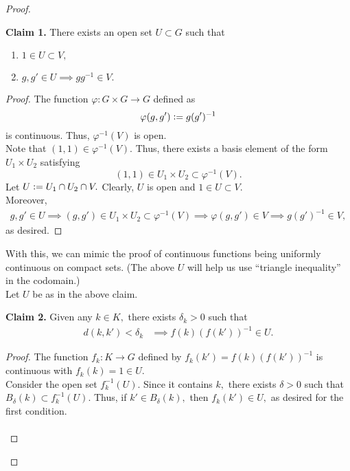 \documentclass[12pt]{article}
\theoremstyle{definition}
\numberwithin{thm}{section}
\newenvironment{blockquote}
{\begin{mdframed}[skipabove=0pt, skipbelow=0pt, innertopmargin=4pt, innerbottommargin=4pt, bottomline=false,topline=false,rightline=false, linewidth=2pt]}
{\end{mdframed}}
\begin{document}
\begin{proof} \phantom{hi}

	\begin{blockquote}
		\textbf{Claim 1.} There exists an open set $U \subset G$ such that
		\begin{enumerate}
			\item $1 \in U \subset V,$
			\item $g, g' \in U \implies gg^{-1} \in V.$
		\end{enumerate}
		\begin{proof} 
			The function $\varphi:G \times G \to G$ defined as
			\begin{equation*} 
				\varphi(g, g') \vcentcolon= g(g')^{-1}
			\end{equation*}
			is continuous. Thus, $\varphi^{-1}(V)$ is open.\\
			Note that $(1, 1) \in \varphi^{-1}(V).$ Thus, there exists a basis element of the form $U_1 \times U_2$ satisfying
			\begin{equation*} 
				(1, 1) \in U_1 \times U_2 \subset \varphi^{-1}(V).
			\end{equation*}
			Let $U\vcentcolon= U_1 \cap U_2 \cap V.$ Clearly, $U$ is open and $1 \in U \subset V.$ \\
			Moreover,
			\begin{align*} 
				g, g' \in U \implies (g, g') \in U_1 \times U_2 \subset \varphi^{-1}(V) \implies \varphi(g, g') \in V \implies g(g')^{-1} \in V,
			\end{align*}
			as desired.
		\end{proof}
	\end{blockquote}
		With this, we can mimic the proof of continuous functions being uniformly continuous on compact sets. (The above $U$ will help us use ``triangle inequality'' in the codomain.)\\
		Let $U$ be as in the above claim.\\
	\begin{blockquote}
		\textbf{Claim 2.} Given any $k \in K,$ there exists $\delta_k > 0$ such that
		\begin{align*} 
			d(k, k') < \delta_k &\implies f(k)(f(k'))^{-1} \in U.	
		\end{align*}
		\begin{proof} 
			The function $f_k : K \to G$ defined by $f_k(k') = f(k)(f(k'))^{-1}$ is continuous with $f_k(k) = 1 \in U.$\\
			Consider the open set $f_k^{-1}(U).$ Since it contains $k,$ there exists $\delta > 0$ such that $B_\delta(k) \subset f_k^{-1}(U).$ Thus, if $k' \in B_\delta(k),$ then $f_k(k') \in U,$ as desired for the first condition.\\~\\

\end{proof}
\end{blockquote}
\end{proof}
\end{document}
